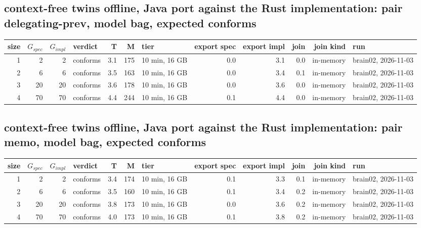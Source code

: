 \documentclass[10pt]{article}
\begin{document}
\subsection*{context-free twins offline, Java port against the Rust implementation: pair \textsf{delegating-prev}, model bag, expected conforms}
\begin{longtable}{@{}rrrlrrlrrrrl@{}}
\toprule
size & $G_{\mathit{spec}}$ & $G_{\mathit{impl}}$ & verdict & T & M & tier & export spec & export impl & join & join kind & run \\
\midrule
\endhead
\color{red} 1 & 2 & 2 & conforms & 3.1 & 175 & 10 min, 16 GB & 0.0 & 3.1 & 0.0 & in-memory & brain02, 2026-11-03 \\
\color{red} 2 & 6 & 6 & conforms & 3.5 & 163 & 10 min, 16 GB & 0.0 & 3.4 & 0.1 & in-memory & brain02, 2026-11-03 \\
\color{red} 3 & 20 & 20 & conforms & 3.6 & 178 & 10 min, 16 GB & 0.0 & 3.6 & 0.0 & in-memory & brain02, 2026-11-03 \\
\color{red} 4 & 70 & 70 & conforms & 4.4 & 244 & 10 min, 16 GB & 0.1 & 4.4 & 0.0 & in-memory & brain02, 2026-11-03 \\
\bottomrule
\end{longtable}
\subsection*{context-free twins offline, Java port against the Rust implementation: pair \textsf{memo}, model bag, expected conforms}
\begin{longtable}{@{}rrrlrrlrrrrl@{}}
\toprule
size & $G_{\mathit{spec}}$ & $G_{\mathit{impl}}$ & verdict & T & M & tier & export spec & export impl & join & join kind & run \\
\midrule
\endhead
\color{red} 1 & 2 & 2 & conforms & 3.4 & 174 & 10 min, 16 GB & 0.1 & 3.3 & 0.1 & in-memory & brain02, 2026-11-03 \\
\color{red} 2 & 6 & 6 & conforms & 3.5 & 160 & 10 min, 16 GB & 0.1 & 3.4 & 0.2 & in-memory & brain02, 2026-11-03 \\
\color{red} 3 & 20 & 20 & conforms & 3.8 & 173 & 10 min, 16 GB & 0.0 & 3.6 & 0.2 & in-memory & brain02, 2026-11-03 \\
\color{red} 4 & 70 & 70 & conforms & 4.0 & 173 & 10 min, 16 GB & 0.1 & 3.8 & 0.2 & in-memory & brain02, 2026-11-03 \\
\bottomrule
\end{longtable}
\end{document}
